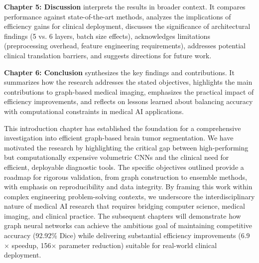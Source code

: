 \textbf{Chapter 5: Discussion} interprets the results in broader context. It compares performance against state-of-the-art methods, analyzes the implications of efficiency gains for clinical deployment, discusses the significance of architectural findings (5 vs. 6 layers, batch size effects), acknowledges limitations (preprocessing overhead, feature engineering requirements), addresses potential clinical translation barriers, and suggests directions for future work.

\textbf{Chapter 6: Conclusion} synthesizes the key findings and contributions. It summarizes how the research addresses the stated objectives, highlights the main contributions to graph-based medical imaging, emphasizes the practical impact of efficiency improvements, and reflects on lessons learned about balancing accuracy with computational constraints in medical AI applications.


\vspace{5mm}

This introduction chapter has established the foundation for a comprehensive investigation into efficient graph-based brain tumor segmentation. We have motivated the research by highlighting the critical gap between high-performing but computationally expensive volumetric CNNs and the clinical need for efficient, deployable diagnostic tools. The specific objectives outlined provide a roadmap for rigorous validation, from graph construction to ensemble methods, with emphasis on reproducibility and data integrity. By framing this work within complex engineering problem-solving contexts, we underscore the interdisciplinary nature of medical AI research that requires bridging computer science, medical imaging, and clinical practice. The subsequent chapters will demonstrate how graph neural networks can achieve the ambitious goal of maintaining competitive accuracy (92.92\% Dice) while delivering substantial efficiency improvements (6.9$\times$ speedup, 156$\times$ parameter reduction) suitable for real-world clinical deployment. 